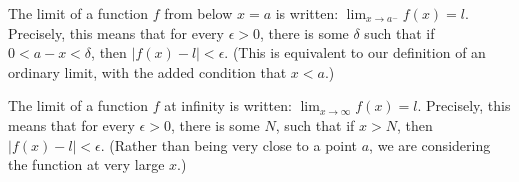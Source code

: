\begin{definition}
The limit of a function $f$ from below $x = a$ is written: $\lim_{x \to a^-} f(x) = l$. Precisely, this means that for every $\epsilon > 0$, there is some $\delta$ such that if $0 < a - x < \delta$, then $|f(x) - l| < \epsilon$. (This is equivalent to our definition of an ordinary limit, with the added condition that $x < a$.)
\end{definition}

\begin{definition}
The limit of a function $f$ at infinity is written: $\lim_{x \to \infty} f(x) = l$. Precisely, this means that for every $\epsilon > 0$, there is some $N$, such that if $x > N$, then $|f(x) - l| < \epsilon$. (Rather than being very close to a point $a$, we are considering the function at very large $x$.)
\end{definition}

